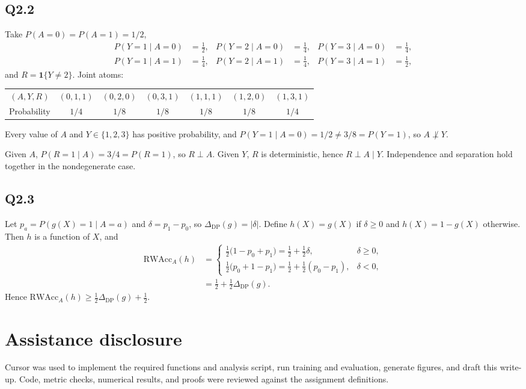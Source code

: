 \documentclass[11pt]{article}
\newcommand{\DP}{\Delta_{\mathrm{DP}}}
\begin{document}
\subsection*{Q2.2}
Take $P(A=0)=P(A=1)=1/2$,
\begin{align*}
P(Y=1\mid A=0)&=\tfrac12,&
P(Y=2\mid A=0)&=\tfrac14,&
P(Y=3\mid A=0)&=\tfrac14,\\
P(Y=1\mid A=1)&=\tfrac14,&
P(Y=2\mid A=1)&=\tfrac14,&
P(Y=3\mid A=1)&=\tfrac12,
\end{align*}
and $R=\mathbf 1\{Y\neq 2\}$. Joint atoms:
\begin{center}
\small
\begin{tabular}{ccccccc}
\toprule
$(A,Y,R)$ & $(0,1,1)$ & $(0,2,0)$ & $(0,3,1)$ & $(1,1,1)$ & $(1,2,0)$ & $(1,3,1)$ \\
Probability & $1/4$ & $1/8$ & $1/8$ & $1/8$ & $1/8$ & $1/4$ \\
\bottomrule
\end{tabular}
\end{center}
Every value of $A$ and $Y\in\{1,2,3\}$ has positive probability, and $P(Y=1\mid A=0)=1/2\neq 3/8=P(Y=1)$, so $A\not\perp Y$.

Given $A$, $P(R=1\mid A)=3/4=P(R=1)$, so $R\perp A$. Given $Y$, $R$ is deterministic, hence $R\perp A\mid Y$. Independence and separation hold together in the nondegenerate case.

\subsection*{Q2.3}
Let $p_a=P(g(X)=1\mid A=a)$ and $\delta=p_1-p_0$, so $\DP(g)=|\delta|$. Define $h(X)=g(X)$ if $\delta\ge 0$ and $h(X)=1-g(X)$ otherwise. Then $h$ is a function of $X$, and
\begin{align*}
\mathrm{RWAcc}_A(h)
&=
\begin{cases}
\frac12\bigl(1-p_0+p_1\bigr)=\frac12+\frac12\delta, & \delta\ge 0,\\[0.25em]
\frac12\bigl(p_0+1-p_1\bigr)=\frac12+\frac12(p_0-p_1), & \delta<0,
\end{cases}
\\
&=
\tfrac12+\tfrac12\DP(g).
\end{align*}
Hence $\mathrm{RWAcc}_A(h)\ge \tfrac12\DP(g)+\tfrac12$.

\section*{Assistance disclosure}
Cursor was used to implement the required functions and analysis script, run training and evaluation, generate figures, and draft this write-up. Code, metric checks, numerical results, and proofs were reviewed against the assignment definitions.
\end{document}
